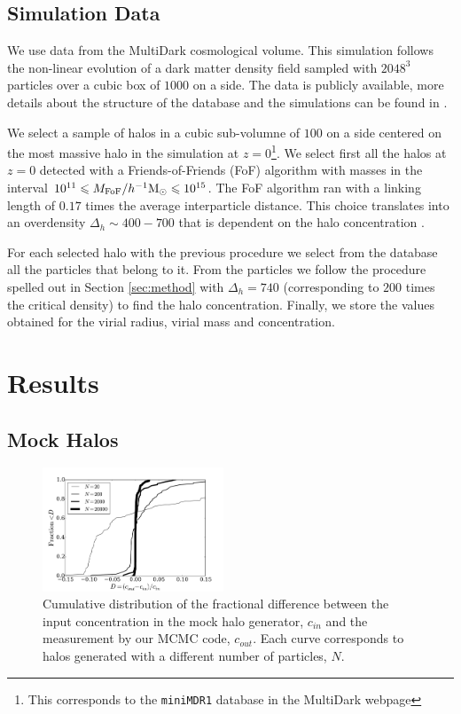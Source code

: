 \documentclass[useAMS,usenatbib]{mn2e}
\newcommand{\hMpc}{{\ifmmode{h^{-1}{\rm Mpc}}\else{$h^{-1}$Mpc }\fi}}
\newcommand{\hMsun}{{\ifmmode{h^{-1}{\rm
        {M_{\odot}}}}\else{$h^{-1}{\rm{M_{\odot}}}$~}\fi}}
\begin{document}
\subsection{Simulation Data}
\label{sec:data}

We use data from the MultiDark cosmological volume. This simulation
follows the non-linear evolution of a dark matter density field
sampled with $2048^3$ particles over a cubic box of $1000$ \hMpc on a
side. The data is publicly available, more details about the structure
of the database and the simulations can be found in
\citep{2013AN....334..691R}. 

We select a sample of halos in a cubic sub-volumne of $100$ \hMpc on a
side centered on the most massive halo in the simulation at
$z=0$\footnote{This corresponds to the \texttt{miniMDR1} database in
  the MultiDark webpage}. We select first all the halos at $z=0$
detected with a Friends-of-Friends (FoF) algorithm with masses in the
interval $10^{11}\leq M_{\rm FoF}/\hMsun \leq 10^{15}$. The FoF
algorithm ran with a linking length of $0.17$ times the average
interparticle distance. This choice translates into an overdensity
$\Delta_h\sim 400-700$ that is dependent on the halo concentration
\citep{More2011}.

For each selected halo with the previous procedure we select from the database
all the particles that belong to it. From the particles we follow the
procedure spelled out in Section \ref{sec:method} with $\Delta_h=740$
(corresponding to $200$ times the critical density) to find the
halo concentration. Finally, we store the values obtained for the
virial radius, virial mass and concentration. 


\section{Results}
\label{sec:results}


\subsection{Mock Halos}
\label{sec:results_mocks}

\begin{figure}
\begin{center}
  \includegraphics[width=0.48\textwidth]{percentual_diff.pdf}
\end{center}
\caption{Cumulative distribution of the fractional difference between
  the input concentration in the mock halo generator, $c_{in}$ and the
  measurement by our MCMC code, $c_{out}$. Each curve corresponds to
  halos generated with a different number of particles, $N$.
    \label{fig:results_mocks}}
\end{figure}
\end{document}
